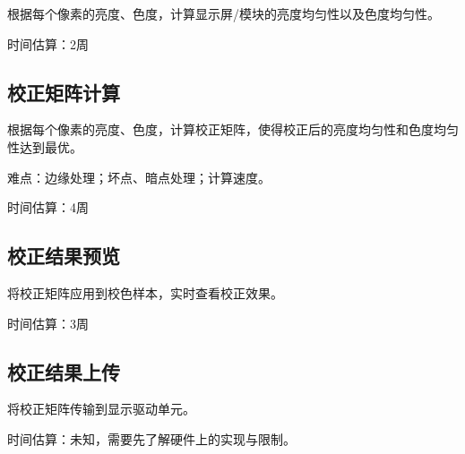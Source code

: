 根据每个像素的亮度、色度，计算显示屏/模块的亮度均匀性以及色度均匀性。

时间估算：2周

\subsection{校正矩阵计算}

根据每个像素的亮度、色度，计算校正矩阵，使得校正后的亮度均匀性和色度均匀性达到最优。

难点：边缘处理；坏点、暗点处理；计算速度。

时间估算：4周

\subsection{校正结果预览}

将校正矩阵应用到校色样本，实时查看校正效果。

时间估算：3周

\subsection{校正结果上传}

将校正矩阵传输到显示驱动单元。

时间估算：未知，需要先了解硬件上的实现与限制。

\clearpage
